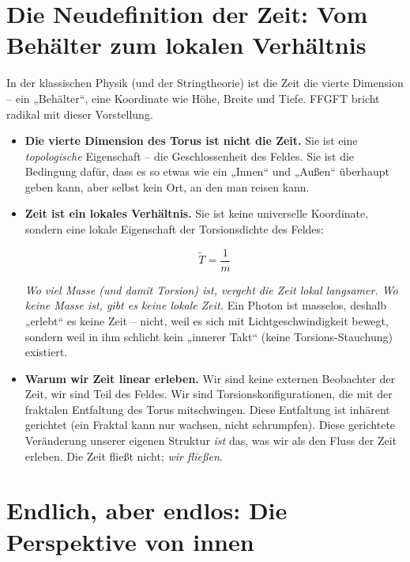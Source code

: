 	\section{Die Neudefinition der Zeit: Vom Behälter zum lokalen Verhältnis}
	
	In der klassischen Physik (und der Stringtheorie) ist die Zeit die vierte Dimension – ein „Behälter“, eine Koordinate wie Höhe, Breite und Tiefe. FFGFT bricht radikal mit dieser Vorstellung.
	
	\begin{itemize}
		\item \textbf{Die vierte Dimension des Torus ist nicht die Zeit.} Sie ist eine \textit{topologische} Eigenschaft – die Geschlossenheit des Feldes. Sie ist die Bedingung dafür, dass es so etwas wie ein „Innen“ und „Außen“ überhaupt geben kann, aber selbst kein Ort, an den man reisen kann.
		
		\item \textbf{Zeit ist ein lokales Verhältnis.} Sie ist keine universelle Koordinate, sondern eine lokale Eigenschaft der Torsionsdichte des Feldes:
		
		\begin{equation}
			\tilde{T} = \frac{1}{m}
			\label{eq:zeit}
		\end{equation}
		
		\textit{Wo viel Masse (und damit Torsion) ist, vergeht die Zeit lokal langsamer. Wo keine Masse ist, gibt es keine lokale Zeit.} Ein Photon ist masselos, deshalb „erlebt“ es keine Zeit – nicht, weil es sich mit Lichtgeschwindigkeit bewegt, sondern weil in ihm schlicht kein „innerer Takt“ (keine Torsions-Stauchung) existiert.
		
		\item \textbf{Warum wir Zeit linear erleben.} Wir sind keine externen Beobachter der Zeit, wir sind Teil des Feldes. Wir sind Torsionskonfigurationen, die mit der fraktalen Entfaltung des Torus mitschwingen. Diese Entfaltung ist inhärent gerichtet (ein Fraktal kann nur wachsen, nicht schrumpfen). Diese gerichtete Veränderung unserer eigenen Struktur \textit{ist} das, was wir als den Fluss der Zeit erleben. Die Zeit fließt nicht; \textit{wir fließen}.
	\end{itemize}
	
	\section{Endlich, aber endlos: Die Perspektive von innen}
	
